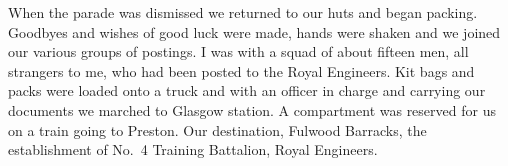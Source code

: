 When the parade was dismissed we returned to our huts and began
packing. Goodbyes and wishes of good luck were made, hands were
shaken and we joined our various groups of postings. I was with a
squad of about fifteen men, all strangers to me, who had been posted
to the Royal Engineers. Kit bags and packs were loaded onto a truck
and with an officer in charge and carrying our documents we marched to
Glasgow station. A compartment was reserved for us on a train going
to Preston. Our destination, Fulwood Barracks, the establishment of
No.~4 Training Battalion, Royal Engineers. 
